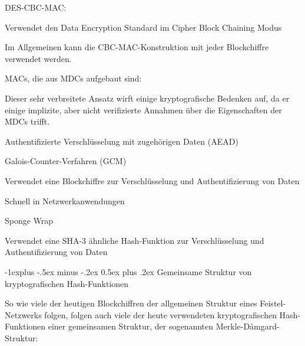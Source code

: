 \documentclass[a4paper]{article}
\makeatletter
\renewcommand{\subsection}{\@startsection{subsection}{2}{0mm}%
 {-1explus -.5ex minus -.2ex}%
 {0.5ex plus .2ex}%
 {\normalfont\normalsize\bfseries}}
\makeatother
\begin{document}
\begin{multicols}{3}
\begin{itemize*}
            \begin{itemize*}
                  \item DES-CBC-MAC:
                  \begin{itemize*} \item Verwendet den Data Encryption Standard im Cipher Block Chaining Modus \item Im Allgemeinen kann die CBC-MAC-Konstruktion mit jeder Blockchiffre verwendet werden. \end{itemize*}
                  \item MACs, die aus MDCs aufgebaut sind:
                  \begin{itemize*} \item Dieser sehr verbreitete Ansatz wirft einige kryptografische Bedenken auf, da er einige implizite, aber nicht verifizierte Annahmen über die Eigenschaften der MDCs trifft. \end{itemize*}
            \end{itemize*}
            \item
            Authentifizierte Verschlüsselung mit zugehörigen Daten (AEAD)

            \begin{itemize*}
                  \item Galois-Counter-Verfahren (GCM)
                  \begin{itemize*} \item Verwendet eine Blockchiffre zur Verschlüsselung und Authentifizierung von Daten \item Schnell in Netzwerkanwendungen \end{itemize*}
                  \item Sponge Wrap
                  \begin{itemize*} \item Verwendet eine SHA-3 ähnliche Hash-Funktion zur Verschlüsselung und Authentifizierung von Daten \end{itemize*}
            \end{itemize*}
      \end{itemize*}


      \subsection{Gemeinsame Struktur von kryptografischen
            Hash-Funktionen}

      \begin{itemize*}
            \item
            So wie viele der heutigen Blockchiffren der allgemeinen Struktur eines
            Feistel-Netzwerks folgen, folgen auch viele der heute verwendeten
            kryptografischen Hash-Funktionen einer gemeinsamen Struktur, der
            sogenannten Merkle-Dåmgard-Struktur:


\end{itemize*}
\end{multicols}
\end{document}
